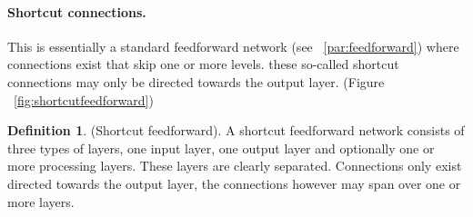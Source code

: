 \documentclass[pdftex,a4paper,12pt,twoside]{report}
\theoremstyle{plain} \newtheorem{theorem}{Theorem} \newtheorem{proposition}{Proposition} \newtheorem{lemma}{Lemma} \newtheorem*{corollary}{Corollary}
\theoremstyle{definition} \newtheorem{definition}{Definition} \newtheorem{conjecture}{Conjecture} \newtheorem*{example}{Example} \newtheorem{algorithm}{Algorithm}
\theoremstyle{remark} \newtheorem*{remark}{Remark} \newtheorem*{note}{Note} \newtheorem{case}{Case}
\begin{document}
\paragraph{Shortcut connections.}
This is essentially a standard feedforward network (see ~\ref{par:feedforward}) where connections exist that skip one or more levels. these so-called shortcut connections may only be directed towards the output layer. (Figure ~\ref{fig:shortcutfeedforward})
\begin{definition}
(Shortcut feedforward). A shortcut feedforward network consists of three types of layers, one input layer, one output layer and optionally one or more processing layers. These layers are clearly separated. Connections only exist directed towards the output layer, the connections however may span over one or more layers.
\end{definition}
\end{document}

